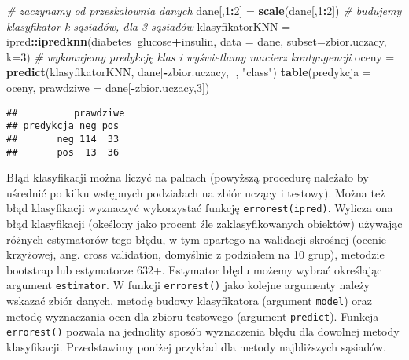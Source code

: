 \documentclass[polish,]{book}
\newenvironment{Shaded}{\begin{snugshade}}{\end{snugshade}}
\newcommand{\CommentTok}[1]{\textcolor[rgb]{0.56,0.35,0.01}{\textit{#1}}}
\newcommand{\DataTypeTok}[1]{\textcolor[rgb]{0.13,0.29,0.53}{#1}}
\newcommand{\DecValTok}[1]{\textcolor[rgb]{0.00,0.00,0.81}{#1}}
\newcommand{\KeywordTok}[1]{\textcolor[rgb]{0.13,0.29,0.53}{\textbf{#1}}}
\newcommand{\NormalTok}[1]{#1}
\newcommand{\OperatorTok}[1]{\textcolor[rgb]{0.81,0.36,0.00}{\textbf{#1}}}
\newcommand{\StringTok}[1]{\textcolor[rgb]{0.31,0.60,0.02}{#1}}
\begin{document}
\begin{Shaded}
\begin{Highlighting}[]
\CommentTok{# zaczynamy od przeskalownia danych}
\NormalTok{dane[,}\DecValTok{1}\OperatorTok{:}\DecValTok{2}\NormalTok{] =}\StringTok{ }\KeywordTok{scale}\NormalTok{(dane[,}\DecValTok{1}\OperatorTok{:}\DecValTok{2}\NormalTok{])}
\CommentTok{# budujemy klasyfikator k-sąsiadów, dla 3 sąsiadów}
\NormalTok{klasyfikatorKNN =}\StringTok{ }\NormalTok{ipred}\OperatorTok{::}\KeywordTok{ipredknn}\NormalTok{(diabetes}\OperatorTok{~}\NormalTok{glucose}\OperatorTok{+}\NormalTok{insulin, }
                                  \DataTypeTok{data =}\NormalTok{ dane, }\DataTypeTok{subset=}\NormalTok{zbior.uczacy, }\DataTypeTok{k=}\DecValTok{3}\NormalTok{)}
\CommentTok{# wykonujemy predykcję klas i wyświetlamy macierz kontyngencji}
\NormalTok{oceny =}\StringTok{ }\KeywordTok{predict}\NormalTok{(klasyfikatorKNN, dane[}\OperatorTok{-}\NormalTok{zbior.uczacy, ], }\StringTok{"class"}\NormalTok{)}
\KeywordTok{table}\NormalTok{(}\DataTypeTok{predykcja =}\NormalTok{ oceny, }\DataTypeTok{prawdziwe =}\NormalTok{ dane[}\OperatorTok{-}\NormalTok{zbior.uczacy,}\DecValTok{3}\NormalTok{])}
\end{Highlighting}
\end{Shaded}

\begin{verbatim}
##          prawdziwe
## predykcja neg pos
##       neg 114  33
##       pos  13  36
\end{verbatim}

Błąd klasyfikacji można liczyć na palcach (powyższą procedurę należało by uśrednić po kilku wstępnych podziałach na zbiór uczący i testowy). Można też błąd klasyfikacji wyznaczyć wykorzystać funkcję \texttt{errorest(ipred)}. Wylicza ona błąd klasyfikacji (okeślony jako procent źle zaklasyfikowanych obiektów) używając różnych
estymatorów tego błędu, w tym opartego na walidacji skrośnej (ocenie krzyżowej,
ang. cross validation, domyślnie z podziałem na 10 grup), metodzie bootstrap lub estymatorze 632+. Estymator błędu możemy wybrać określając argument \texttt{estimator}.
W funkcji \texttt{errorest()} jako kolejne argumenty należy wskazać zbiór danych, metodę
budowy klasyfikatora (argument \texttt{model}) oraz metodę wyznaczania ocen dla zbioru
testowego (argument \texttt{predict}). Funkcja \texttt{errorest()} pozwala na jednolity sposób
wyznaczenia błędu dla dowolnej metody klasyfikacji. Przedstawimy poniżej przykład
dla metody najbliższych sąsiadów.
\end{document}
